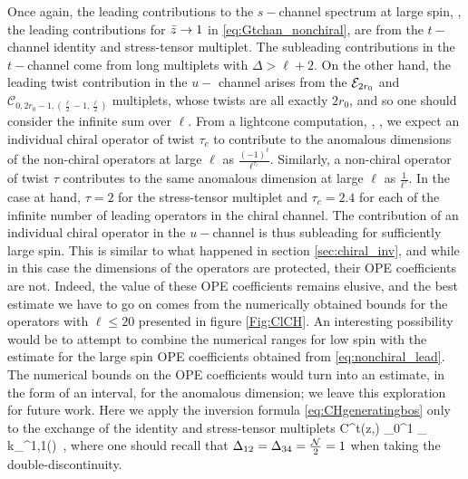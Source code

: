 Once again, the leading contributions to the $s-$channel spectrum at large spin, \ie, the leading contributions for  ${\bar{z}} \to 1$ in \eqref{eq:Gtchan_nonchiral}, are from the  $t-$channel identity and stress-tensor multiplet. The subleading contributions in the $t-$channel come from long multiplets with $\Delta > \ell + 2$. On the other hand, the leading twist contribution in the $u-$ channel arises from the ${\mathcal{E}}_{2r_0}$ and $\mathcal{C}_{0,2 r_0-1,\left(\frac{\ell }{2}-1,\frac{\ell }{2}\right)}$ multiplets, whose twists are all exactly $2r_0$, and so one should consider the infinite sum over $\ell$. 
From a lightcone computation, \eg, \cite{Li:2015rfa}, we expect an individual chiral operator of twist $\tau_c$ to contribute to the anomalous dimensions of the non-chiral operators at large $\ell$ as $\frac{(-1)^\ell}{\ell^{\tau_c}}$. Similarly, a non-chiral operator of twist  $\tau$ contributes to the same anomalous dimension at large $\ell$ as $\frac{1}{\ell^{\tau}}$. In the case at hand, $\tau=2$ for the stress-tensor multiplet and $\tau_c=2.4$ for each of the infinite number of leading operators in the chiral channel. The contribution of an individual chiral operator in the $u-$channel is thus subleading for sufficiently large spin. This is similar to what happened in section \ref{sec:chiral_inv}, and while in this case the dimensions of the operators are protected, their OPE coefficients are not. Indeed, the value of these OPE coefficients remains elusive, and the best estimate we have to go on comes from the numerically obtained bounds for the operators with $\ell \leqslant 20$ presented in figure \ref{Fig:ClCH}. An interesting possibility would be to attempt to combine the numerical ranges for low spin with the estimate for the large spin OPE coefficients obtained from \eqref{eq:nonchiral_lead}. The numerical bounds on the OPE coefficients would turn into an estimate, in the form of an interval, for the anomalous dimension; we leave this exploration for future work. Here we apply the inversion formula \eqref{eq:CHgeneratingbos} only to the exchange of the identity and stress-tensor multiplets
\be 
C^t(z,\beta) \supset \int\limits_0^1  \kappa_{\beta} k_\beta^{1,1}(\zb) \dDisc{}\,,
\label{eq:CHgeneratingsuper}
\ee
where one should recall that $\Delta_{12}=\Delta_{34}= \frac{{\mathcal{N}}}{2}=1$ when taking the double-discontinuity.


